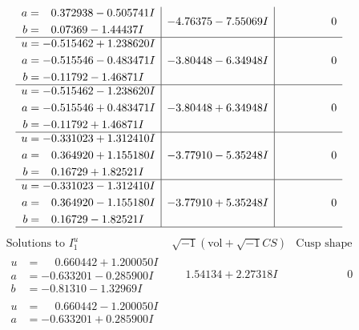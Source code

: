 \documentclass[1p]{elsarticle_modified}
\theoremstyle{definition}
\newcommand{\I}{\sqrt{-1}}
\begin{document}
$$\begin{array}{c|c|c}
\begin{aligned}
a &= \phantom{-}0.372938 - 0.505741 I \\
b &= \phantom{-}0.07369 - 1.44437 I\end{aligned}
 & -4.76375 - 7.55069 I & \phantom{-0.000000 } 0 \\ \hline\begin{aligned}
u &= -0.515462 + 1.238620 I \\
a &= -0.515546 - 0.483471 I \\
b &= -0.11792 - 1.46871 I\end{aligned}
 & -3.80448 - 6.34948 I & \phantom{-0.000000 } 0 \\ \hline\begin{aligned}
u &= -0.515462 - 1.238620 I \\
a &= -0.515546 + 0.483471 I \\
b &= -0.11792 + 1.46871 I\end{aligned}
 & -3.80448 + 6.34948 I & \phantom{-0.000000 } 0 \\ \hline\begin{aligned}
u &= -0.331023 + 1.312410 I \\
a &= \phantom{-}0.364920 + 1.155180 I \\
b &= \phantom{-}0.16729 + 1.82521 I\end{aligned}
 & -3.77910 - 5.35248 I & \phantom{-0.000000 } 0 \\ \hline\begin{aligned}
u &= -0.331023 - 1.312410 I \\
a &= \phantom{-}0.364920 - 1.155180 I \\
b &= \phantom{-}0.16729 - 1.82521 I\end{aligned}
 & -3.77910 + 5.35248 I & \phantom{-0.000000 } 0\\
 \hline 
 \end{array}$$\newpage$$\begin{array}{c|c|c}  
\text{Solutions to }I^u_{1}& \I (\text{vol} + \sqrt{-1}CS) & \text{Cusp shape}\\
 \hline 
\begin{aligned}
u &= \phantom{-}0.660442 + 1.200050 I \\
a &= -0.633201 - 0.285900 I \\
b &= -0.81310 - 1.32969 I\end{aligned}
 & \phantom{-}1.54134 + 2.27318 I & \phantom{-0.000000 } 0 \\ \hline\begin{aligned}
u &= \phantom{-}0.660442 - 1.200050 I \\
a &= -0.633201 + 0.285900 I \\

\end{aligned}
\end{array}$$
\end{document}
